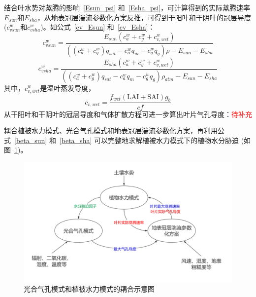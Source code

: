 结合叶水势对蒸腾的影响~\eqref{Esun_psi} 和~\eqref{Esha_psi}，可计算得到的实际蒸腾速率$E_{sun}$和$E_{sha}$，从地表冠层湍流参数化方案反推，可得到干阳叶和干阴叶的冠层导度 ($c_{vsun}^{w}$和$c_{vsha}^{w}$)。如公式~\eqref{cv_Esun} 和~\eqref{cv_Esha}：
\begin{equation}\label{cv_Esun}c_{vsun}^{w}=\frac{E_{sun}\left(c_a^w+c_g^w+c_{v,wet}^{w}\right)}{\left(\left(c_a^w+c_g^w\right)q_{sat}-c_a^w q_m - c_g^w q_g\right)\rho-E_{sun}-E_{sha}}
\end{equation}
%
\begin{equation}\label{cv_Esha}
c_{vsha}^{w}=\frac{E_{sha}\left(c_a^w+c_g^w+c_{v,wet}^{w}\right)}{\left(\left(c_a^w+c_g^w\right)q_{sat}-c_a^w q_m - c_g^w q_g\right)\rho_{atm}-E_{sun}-E_{sha}}
\end{equation}
其中，$c_{v,wet}^{w}$是湿叶蒸发导度，
\begin{equation}\label{cwet}
c_{v,wet}=\frac{f_{wet}\left(\text{LAI}+\text{SAI}\right)g_b}{cf}
\end{equation}
从干阳叶和干阴叶的冠层导度和气体扩散方程可进一步算出叶片气孔导度：\textcolor{red}{待补充}
%

耦合植被水力模式、光合气孔模式和地表冠层湍流参数化方案，再利用公式~\eqref{beta_sun} 和~\eqref{beta_sha} 可以完整地求解植被水力模式下的植物水分胁迫 (如图~\ref{fig:光合气孔模式和植被水力模式的耦合示意图})。
{
    \begin{figure}[htbp]
    \centering
    \includegraphics{Figures/植被水力模式/光合气孔模式和植被水力模式的耦合示意图.png}
    \caption{光合气孔模式和植被水力模式的耦合示意图}
    \label{fig:光合气孔模式和植被水力模式的耦合示意图}
    \end{figure}
}


